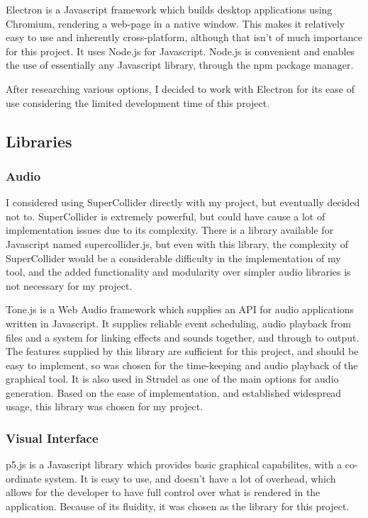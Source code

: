 \documentclass[12pt,a4paper,twoside,openright]{report}
\begin{document}
Electron is a Javascript framework which builds desktop applications using Chromium, rendering a web-page in a native window. This makes it relatively easy to use and inherently cross-platform, although that isn't of much importance for this project. It uses Node.js for Javascript. Node.js is convenient and enables the use of essentially any Javascript library, through the npm package manager.

After researching various options, I decided to work with Electron for its ease of use considering the limited development time of this project.

\subsection{Libraries}
\subsubsection{Audio}
I considered using SuperCollider directly with my project, but eventually decided not to. SuperCollider is extremely powerful, but could have cause a lot of implementation issues due to its complexity. There is a library available for Javascript named supercollider.js, but even with this library, the complexity of SuperCollider would be a considerable difficulty in the implementation of my tool, and the added functionality and modularity over simpler audio libraries is not necessary for my project.

Tone.js is a Web Audio framework which supplies an API for audio applications written in Javascript. It supplies reliable event scheduling, audio playback from files and a system for linking effects and sounds together, and through to output. The features supplied by this library are sufficient for this project, and should be easy to implement, so was chosen for the time-keeping and audio playback of the graphical tool. It is also used in Strudel as one of the main options for audio generation. Based on the ease of implementation, and established widespread usage, this library was chosen for my project.

\subsubsection{Visual Interface}
p5.js is a Javascript library which provides basic graphical capabilites, with a co-ordinate system. It is easy to use, and doesn't have a lot of overhead, which allows for the developer to have full control over what is rendered in the application. Because of its fluidity, it was chosen as the library for this project.
\end{document}
